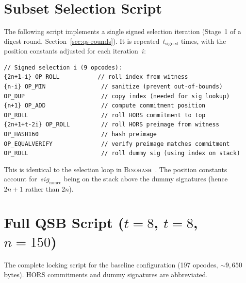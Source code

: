 \documentclass[11pt, a4paper]{article}
\begin{document}
\appendix

\section{Subset Selection Script}
\label{app:selection-script}

The following script implements a single signed selection iteration (Stage~1 of a digest round, Section~\ref{sec:qs-rounds}). It is repeated~$t_{\mathrm{signed}}$ times, with the position constants adjusted for each iteration~$i$:

\begin{lstlisting}[language={}, numbers=none]
// Signed selection i (9 opcodes):
{2n+1-i} OP_ROLL           // roll index from witness
{n-i} OP_MIN                // sanitize (prevent out-of-bounds)
OP_DUP                      // copy index (needed for sig lookup)
{n+1} OP_ADD                // compute commitment position
OP_ROLL                     // roll HORS commitment to top
{2n+1+t-2i} OP_ROLL         // roll HORS preimage from witness
OP_HASH160                  // hash preimage
OP_EQUALVERIFY              // verify preimage matches commitment
OP_ROLL                     // roll dummy sig (using index on stack)
\end{lstlisting}

\noindent This is identical to the selection loop in \textsc{Binohash}~\cite[Appendix~B]{linus2024binohash}. The position constants account for~$\mathit{sig}_{\mathrm{nonce}}$ being on the stack above the dummy signatures (hence $2n + 1$ rather than $2n$).

\section{Full QSB Script ($t = 8$, $t = 8$, $n = 150$)}
\label{app:full-script}

The complete locking script for the baseline configuration (197 opcodes, ${\sim}9{,}650$ bytes). HORS commitments and dummy signatures are abbreviated.
\end{document}
